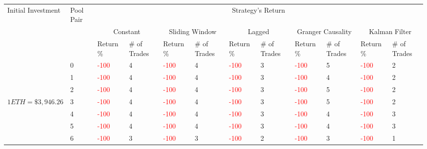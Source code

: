 \begin{table}[htb!]
    \centering
    \begin{adjustwidth}{-0.9in}{-0.9in}
        \begin{tabular}{|p{5em}|p{2em}|p{3em}|p{3em}|p{3em}|p{3em}|p{3em}|p{3em}|p{3em}|p{3em}|p{3em}|p{3em}|}\hline
            Initial Investment & Pool Pair & \multicolumn{10}{|c|}{Strategy's Return} \\\cline{3-12}
            &   & \multicolumn{2}{|c|}{Constant} & \multicolumn{2}{|c|}{Sliding Window} & \multicolumn{2}{|c|}{Lagged} & \multicolumn{2}{|c|}{Granger Causality} & \multicolumn{2}{|c|}{Kalman Filter}\\\cline{3-12}
            & & Return \% & \# of Trades & Return \% & \# of Trades & Return \% & \# of Trades & Return \% & \# of Trades & Return \% & \# of Trades\\\hline

            & 0 & \textcolor{red}{-100} & 4 & \textcolor{red}{-100} & 4 & \textcolor{red}{-100} & 3 & \textcolor{red}{-100} & 5 & \textcolor{red}{-100} & 2\\\cline{3-12}
            & 1 & \textcolor{red}{-100} & 4 & \textcolor{red}{-100} & 4 & \textcolor{red}{-100} & 3 & \textcolor{red}{-100} & 4 & \textcolor{red}{-100} & 2\\\cline{3-12}
            & 2 & \textcolor{red}{-100} & 4 & \textcolor{red}{-100} & 4 & \textcolor{red}{-100} & 3 & \textcolor{red}{-100} & 5 & \textcolor{red}{-100} & 2\\\cline{3-12}
            $1 ETH = \$3,946.26$ & 3 & \textcolor{red}{-100} & 4 & \textcolor{red}{-100} & 4 & \textcolor{red}{-100} & 3 & \textcolor{red}{-100} & 5 & \textcolor{red}{-100} & 2\\[-3ex]\cline{3-12}
            & 4 & \textcolor{red}{-100} & 4 & \textcolor{red}{-100} & 4 & \textcolor{red}{-100} & 3 & \textcolor{red}{-100} & 4 & \textcolor{red}{-100} & 3\\\cline{3-12}
            & 5 & \textcolor{red}{-100} & 4 & \textcolor{red}{-100} & 4 & \textcolor{red}{-100} & 3 & \textcolor{red}{-100} & 4 & \textcolor{red}{-100} & 3\\\cline{3-12}
            & 6 & \textcolor{red}{-100} & 3 & \textcolor{red}{-100} & 3 & \textcolor{red}{-100} & 2 & \textcolor{red}{-100} & 3 & \textcolor{red}{-100} & 1\\\hline\hline


\end{tabular}
\end{adjustwidth}
\end{table}
